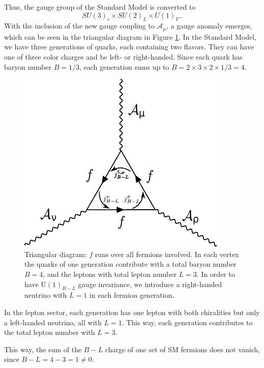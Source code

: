 Thus, the gauge group of the Standard Model is converted to 
\begin{equation}
	SU(3)_c\times SU(2)_L\times U(1)_{Y'}.
\end{equation}
With the inclusion of the new gauge coupling to $\mathcal{A}_{\mu}$, a gauge anomaly emerges, which can be seen in the triangular diagram in Figure \ref{fig:anomaly}.  In the Standard Model, we have three generations of quarks, each containing two flavors. They can have one of three color charges and be left- or right-handed. Since each quark has baryon number $B=1/3$, each generation sums up to $B = 2\times 3\times 2 \times 1/3 = 4$. 
\begin{figure}
\center
\includegraphics[scale=1]{./figures/triangularanomaly.pdf}
\caption{Triangular diagram: $f$ runs over all fermions involved. In each vertex the quarks of one generation contribute with a total baryon number $B=4$, and the leptons with total lepton number $L=3$. In order to have $\text{U}(1)_{B-L}$ gauge invariance, we introduce a right-handed neutrino with $L=1$ in each fermion generation.}
\label{fig:anomaly}
\end{figure}
In the lepton sector, each generation has one lepton with both chiralities but only a left-handed neutrino, all with $L=1$. This way, each generation contributes to the total lepton number with $L=3$.

This way, the sum of  the $B-L$ charge of one set of SM fermions does not vanish, since $B-L= 4-3=1\neq 0$.

